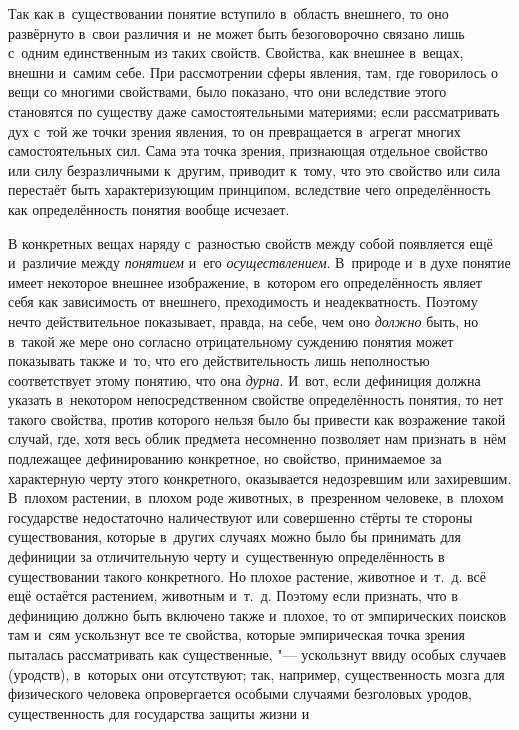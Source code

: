 Так как в~существовании понятие вступило в~область внешнего,
то оно развёрнуто в~свои различия и~не может быть безоговорочно связано
лишь с~одним единственным из таких свойств. Свойства, как внешнее в~вещах,
внешни и~самим себе. При рассмотрении сферы явления, там, где говорилось о
вещи со многими свойствами, было показано, что они вследствие этого
становятся по существу даже самостоятельными материями; если рассматривать
дух с~той же точки зрения явления, то он превращается в~агрегат многих
самостоятельных сил. Сама эта точка зрения, признающая отдельное свойство
или силу безразличными к~другим, приводит к~тому, что это свойство или сила
перестаёт быть характеризующим принципом, вследствие чего определённость
как определённость понятия вообще исчезает.

В конкретных вещах наряду с~разностью свойств между собой
появляется ещё и~различие между {\em понятием} и~его {\em осуществлением}.
В~природе и~в духе понятие имеет некоторое внешнее изображение, в~котором его
определённость являет себя как зависимость от внешнего, преходимость и
неадекватность. Поэтому нечто действительное показывает, правда, на себе,
чем оно {\em должно}
быть, но в~такой же мере оно согласно отрицательному суждению
понятия может показывать также и~то, что его действительность лишь
неполностью соответствует этому понятию, что она {\em дурна}. И~вот, если
дефиниция должна указать в~некотором непосредственном свойстве
определённость понятия, то нет такого свойства, против которого нельзя было
бы привести как возражение такой случай, где, хотя весь облик предмета
несомненно позволяет нам признать в~нём подлежащее
дефинированию конкретное, но свойство, принимаемое за характерную черту
этого конкретного, оказывается недозревшим или захиревшим. В~плохом
растении, в~плохом роде животных, в~презренном человеке, в~плохом
государстве недостаточно наличествуют или совершенно стёрты те стороны
существования, которые в~других случаях можно было бы принимать для
дефиниции за отличительную черту и~существенную определённость в
существовании такого конкретного. Но плохое растение, животное и~т.~д. всё
ещё остаётся растением, животным и~т.~д. Поэтому если признать, что в
дефиницию должно быть включено также и~плохое, то от эмпирических поисков
там и~сям ускользнут все те свойства, которые эмпирическая точка зрения
пыталась рассматривать как существенные, "--- ускользнут ввиду
особых случаев (уродств), в~которых они отсутствуют; так, например,
существенность мозга для физического человека опровергается особыми
случаями безголовых уродов, существенность для государства защиты жизни и
